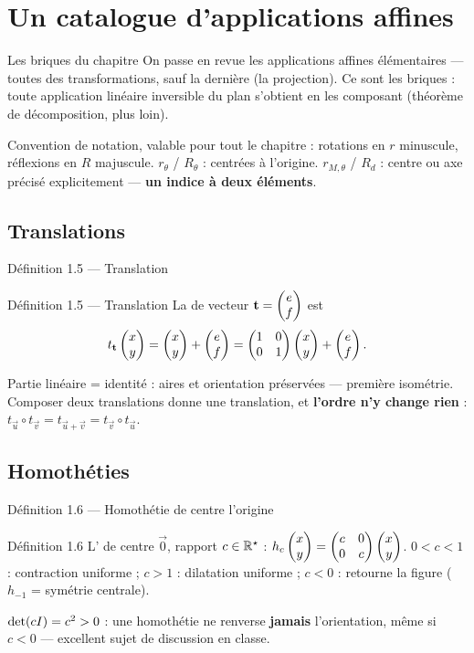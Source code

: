 \section{Un catalogue d'applications affines}

\begin{frame}{Les briques du chapitre}
  \small On passe en revue les applications affines élémentaires ---
  toutes des transformations, sauf la dernière (la projection). Ce sont
  les briques : toute application linéaire inversible du plan s'obtient
  en les composant (théorème de décomposition, plus loin).

  \vspace{6pt}
  Convention de notation, valable pour tout le chapitre : rotations en
  $r$ minuscule, réflexions en $R$ majuscule. $r_\theta$ / $R_\theta$ :
  centrées à l'origine. $r_{M,\theta}$ / $R_d$ : centre ou axe précisé
  explicitement --- \textbf{un indice à deux éléments}.
\end{frame}

\subsection{Translations}
\begin{frame}{Définition 1.5 --- Translation}
  \begin{Enonce}{Définition 1.5 --- Translation}
    La  de vecteur $\mathbf{t} = \begin{pmatrix}e\\ f\end{pmatrix}$ est
    \[
      t_{\mathbf{t}}\begin{pmatrix}x\\ y\end{pmatrix} = \begin{pmatrix}x\\ y\end{pmatrix} + \begin{pmatrix}e\\ f\end{pmatrix}
      = \begin{pmatrix}1 & 0\\ 0 & 1\end{pmatrix}\begin{pmatrix}x\\ y\end{pmatrix} + \begin{pmatrix}e\\ f\end{pmatrix}.
    \]
  \end{Enonce}
  \vspace{6pt}
  \small Partie linéaire = identité : aires et orientation préservées
  --- première isométrie. Composer deux translations donne une
  translation, et \textbf{l'ordre n'y change rien} :
  $t_{\vec u}\circ t_{\vec v} = t_{\vec u+\vec v} = t_{\vec v}\circ t_{\vec u}$.
\end{frame}

\subsection{Homothéties}
\begin{frame}{Définition 1.6 --- Homothétie de centre l'origine}
  \begin{Enonce}{Définition 1.6}
    L' de centre $\vec 0$, rapport $c\in\operatorname{\mathbb{R}^{\star}}$ :
    $h_c\begin{pmatrix}x\\ y\end{pmatrix} = \begin{pmatrix}c & 0\\ 0 & c\end{pmatrix}\begin{pmatrix}x\\ y\end{pmatrix}$. $0<c<1$ : contraction
    uniforme ; $c>1$ : dilatation uniforme ; $c<0$ : retourne la figure
    ($h_{-1}$ = symétrie centrale).
  \end{Enonce}
  \small $\operatorname{det}(cI) = c^2 > 0$ : une homothétie ne renverse
  \textbf{jamais} l'orientation, même si $c<0$ --- excellent sujet de
  discussion en classe.
\end{frame}


